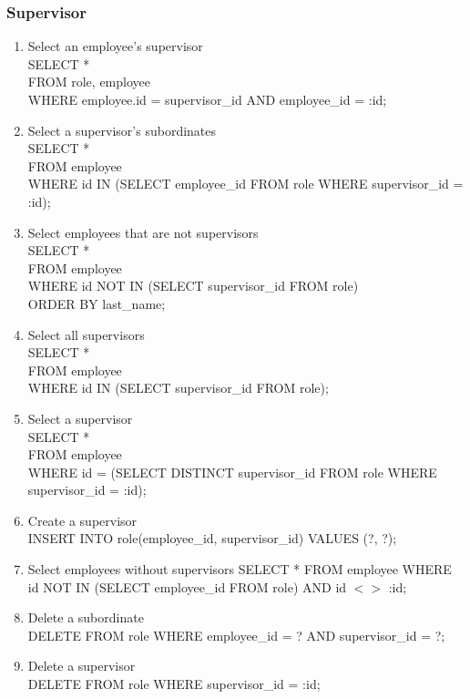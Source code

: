 \documentclass[fleqn, 11pt,letterpaper]{article}
\begin{document}
	\subsubsection{Supervisor}
	\begin{enumerate}
		\item Select an employee's supervisor\\SELECT * \\FROM role, employee \\WHERE employee.id = supervisor\_id AND employee\_id = :id;
		\item Select a supervisor's subordinates \\SELECT * \\FROM employee \\WHERE id IN (SELECT employee\_id FROM role WHERE supervisor\_id = :id);
		\item Select employees that are not supervisors \\SELECT * \\FROM employee \\WHERE id NOT IN (SELECT supervisor\_id FROM role) \\ORDER BY last\_name;
		\item Select all supervisors \\SELECT * \\FROM employee \\WHERE id IN (SELECT supervisor\_id FROM role);
		\item Select a supervisor\\SELECT * \\FROM employee \\WHERE id = (SELECT DISTINCT supervisor\_id FROM role WHERE supervisor\_id = :id);
		\item Create a supervisor \\INSERT INTO role(employee\_id, supervisor\_id) VALUES (?, ?);
		\item Select employees without supervisors SELECT * FROM employee WHERE id NOT IN (SELECT employee\_id FROM role) AND id $<$$>$ :id;
		\item Delete a subordinate \\DELETE FROM role WHERE employee\_id = ? AND supervisor\_id = ?;
		\item Delete a supervisor \\DELETE FROM role WHERE supervisor\_id = :id;
	\end{enumerate}
\end{document}
